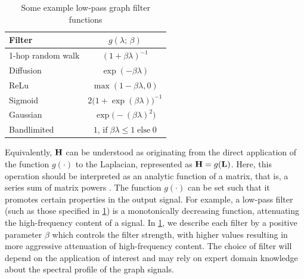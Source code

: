 \begin{table}[t]
    \vspace*{0.5cm}
    \centering
    \setlength{\tabcolsep}{10pt}
    \def\arraystretch{1.8}
    \begin{tabular}{@{}l c@{}}
        \toprule
        \textbf{Filter}   & $g(\lambda; \,\beta)$   \\
        \midrule
        1-hop random walk & $(1 + \beta \lambda)^{-1}$ \\
        Diffusion         & $\exp(-\beta \lambda)$\\
        ReLu              & $\max (1 - \beta \lambda, 0)$\\
        Sigmoid           & $2 \big( 1 + \exp(\beta \lambda)\big)^{-1}$\\
        Gaussian          & $\exp \big(-(\beta \lambda)^2\big)$\\
        Bandlimited       & $1, \,\text{if} \; \beta \lambda \leq 1 \; \text{else} \; 0$ \\
        \bottomrule
    \end{tabular}
    \caption[Example graph filter functions]{Some example low-pass graph filter functions}
    \label{tab:iso_filters}
    \vspace*{0.5cm}
\end{table}


Equivalently, $\mathbf{H}$ can be understood as originating from the direct application of the function $g(\cdot)$ to the Laplacian, represented as $\mathbf{H} = g(\mathbf{L})$. Here, this operation should be interpreted as an analytic function of a matrix, that is, a series sum of matrix powers \citep{Bhatia1997}. The function $g(\cdot)$ can be set such that it promotes certain properties in the output signal. For example, a low-pass filter (such as those specified in \cref{tab:iso_filters}) is a monotonically decreasing function, attenuating the high-frequency content of a signal. In \cref{tab:iso_filters}, we describe each filter by a positive parameter $\beta$ which controls the filter strength, with higher values resulting in more aggressive attenuation of high-frequency content. The choice of filter will depend on the application of interest and may rely on expert domain knowledge about the spectral profile of the graph signals. 

